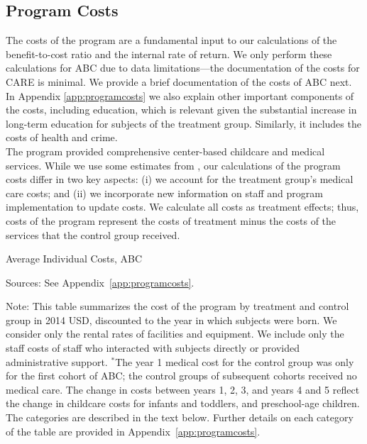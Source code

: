 \subsection{Program Costs}

\noindent The costs of the program are a fundamental input to our calculations of the benefit-to-cost ratio and the internal rate of return. We only perform these calculations for ABC due to data limitations---the documentation of the costs for  CARE is minimal. We provide a brief documentation of the costs of ABC next. In Appendix \ref{app:programcosts} we also explain other important components of the costs, including education, which is relevant given the substantial increase in long-term education for subjects of the treatment group. Similarly, it includes the costs of health and crime.\\


\noindent The program provided comprehensive center-based childcare and medical services. While we use some estimates from \cite{Masse_Barnett_2002_BOOKBenefitCostAnalysis}, our calculations of the program costs differ in two key aspects: (i) we account for the treatment group's medical care costs; and (ii) we incorporate new information on staff and program implementation to update costs. We calculate all costs as treatment effects; thus, costs of the program represent the costs of treatment minus the costs of the services that the control group received.\\

\begin{table}[H]
\begin{threeparttable}
\caption{Average Individual Costs, ABC} \label{tab:totalcosts}
\footnotesize

\begin{tablenotes}
\footnotesize
\item Sources: See Appendix~\ref{app:programcosts}.\\
\item Note: This table summarizes the cost of the program by treatment and control group in 2014 USD, discounted to the year in which subjects were born. We consider only the rental rates of facilities and equipment. We include only the staff costs of staff who interacted with subjects directly or provided administrative support. $^{*}$The year 1 medical cost for the control group was only for the first cohort of ABC; the control groups of subsequent cohorts received no medical care. The change in costs between years 1, 2, 3, and years 4 and 5 reflect the change in childcare costs for infants and toddlers, and preschool-age children. The categories are described in the text below. Further details on each category of the table are provided in Appendix~\ref{app:programcosts}.
\end{tablenotes}
\end{threeparttable}
\end{table}


